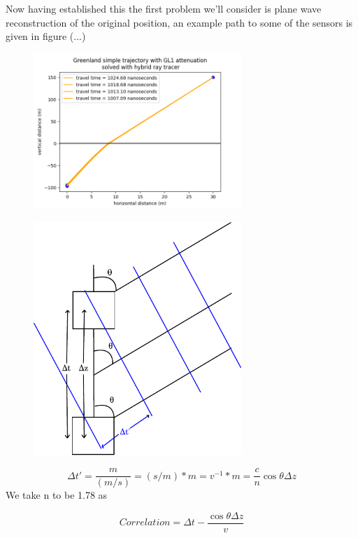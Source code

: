 \documentclass[11pt,a4paper,faculty=we,language=en,doctype=report]{cls/ugent-doc}
\begin{document}
Now having established this the first problem we'll consider is plane wave reconstruction of the original position, an example path to some of the sensors
is given in figure (...)
\begin{figure}
	\centering
	\includegraphics[width=0.7\textwidth]{weerballontraject.png}
\end{figure}
\begin{figure}
	\centering
	\includegraphics[width=0.7\textwidth]{planewave.pdf}
\end{figure}
\begin{equation}
	\Delta t' = \frac{m}{(m/s)} = (s/m)*m = v^{-1} * m = \frac{c}{n} \cos\theta \Delta z
\end{equation}
We take n to be 1.78 as 

\begin{equation}
	Correlation = \Delta t - \frac{\cos\theta \Delta z}{v}
\end{equation}
\end{document}

